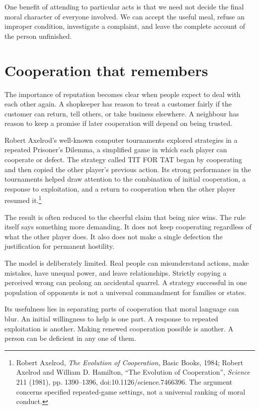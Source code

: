 \documentclass[12pt,a4paper]{book}
\begin{document}
One benefit of attending to particular acts is that we need not decide the final moral character of everyone involved. We can accept the useful meal, refuse an improper condition, investigate a complaint, and leave the complete account of the person unfinished.

\section*{Cooperation that remembers}

The importance of reputation becomes clear when people expect to deal with each other again. A shopkeeper has reason to treat a customer fairly if the customer can return, tell others, or take business elsewhere. A neighbour has reason to keep a promise if later cooperation will depend on being trusted.

Robert Axelrod's well-known computer tournaments explored strategies in a repeated Prisoner's Dilemma, a simplified game in which each player can cooperate or defect. The strategy called TIT FOR TAT began by cooperating and then copied the other player's previous action. Its strong performance in the tournaments helped draw attention to the combination of initial cooperation, a response to exploitation, and a return to cooperation when the other player resumed it.\footnote{Robert Axelrod, \emph{The Evolution of Cooperation}, Basic Books, 1984; Robert Axelrod and William D. Hamilton, ``The Evolution of Cooperation'', \emph{Science} 211 (1981), pp. 1390--1396, doi:10.1126/science.7466396. The argument concerns specified repeated-game settings, not a universal ranking of moral conduct.}

The result is often reduced to the cheerful claim that being nice wins. The rule itself says something more demanding. It does not keep cooperating regardless of what the other player does. It also does not make a single defection the justification for permanent hostility.

The model is deliberately limited. Real people can misunderstand actions, make mistakes, have unequal power, and leave relationships. Strictly copying a perceived wrong can prolong an accidental quarrel. A strategy successful in one population of opponents is not a universal commandment for families or states.

Its usefulness lies in separating parts of cooperation that moral language can blur. An initial willingness to help is one part. A response to repeated exploitation is another. Making renewed cooperation possible is another. A person can be deficient in any one of them.
\end{document}
